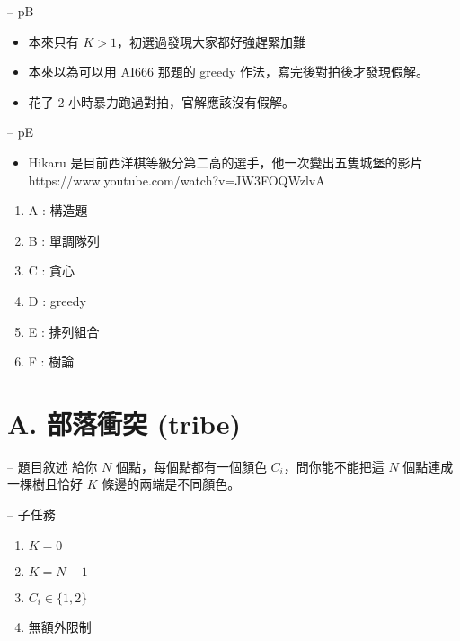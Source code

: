 \documentclass[hyperref,UTF8,notheorems,xcolor={dvipsnames}]{beamer}
\newcommand{\btitle}[1]{{\secname} -- #1}
\theoremstyle{definition}
\begin{document}
\begin{frame}[fragile]{\btitle{pB}}
	\begin{itemize}
		\item 本來只有 $K > 1$，初選過發現大家都好強趕緊加難
		\pause
		\item 本來以為可以用 AI666 那題的 greedy 作法，寫完後對拍後才發現假解。
		\pause
		\item 花了 2 小時暴力跑過對拍，官解應該沒有假解。
	\end{itemize}
\end{frame}

\begin{frame}[fragile]{\btitle{pE}}
	\begin{itemize}
		\item Hikaru 是目前西洋棋等級分第二高的選手，他一次變出五隻城堡的影片 https://www.youtube.com/watch?v=JW3FOQWzlvA
	\end{itemize}
\end{frame}


\begin{frame}[fragile]{\secname}
	\begin{enumerate}
		\item A : 構造題
		\item B : 單調隊列
		\item C : 貪心
		\item D : greedy
		\item E : 排列組合
		\item F : 樹論
	\end{enumerate}
\end{frame}

\section{A. 部落衝突 (tribe)}


\begin{frame}[fragile]{\btitle{題目敘述}}
	給你 $N$ 個點，每個點都有一個顏色 $C_i$，問你能不能把這 $N$ 個點連成一棵樹且恰好 $K$ 條邊的兩端是不同顏色。
\end{frame}

\begin{frame}[fragile]{\btitle{子任務}}
	\begin{enumerate}
		\item $K = 0$
		\item $K = N - 1$
		\item $C_i \in \{1, 2\}$
		\item 無額外限制
	\end{enumerate}
\end{frame}
\end{document}
